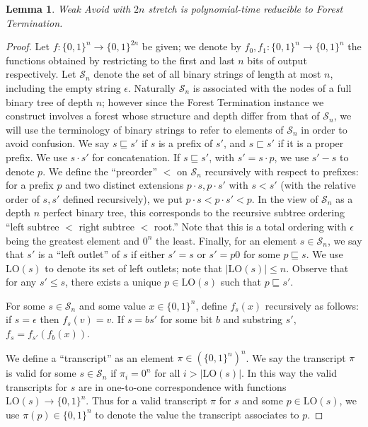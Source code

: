 \documentclass[11pt]{article}
\newtheorem{lemma}{Lemma}
\newcommand{\B}{\{0,1\}}
\begin{document}
\begin{lemma}\label{lem:avoid-forest}
Weak Avoid with $2n$ stretch is polynomial-time reducible to Forest Termination.
\end{lemma}
\begin{proof}
Let $f: \B^n \to \B^{2n}$ be given; we denote by $f_0,f_1: \B^n \to \B^n$ the functions obtained by restricting to the first and last $n$ bits of output respectively. Let $\mathcal{S}_n$ denote the set of all binary strings of length at most $n$, including the empty string $\epsilon$. Naturally $\mathcal{S}_n$ is associated with the nodes of a full binary tree of depth $n$; however since the Forest Termination instance we construct involves a forest whose structure and depth differ from that of $\mathcal{S}_n$, we will use the terminology of binary strings to refer to elements of $\mathcal{S}_n$ in order to avoid confusion. We say $s \sqsubseteq s'$ if $s$ is a prefix of $s'$, and $s\sqsubset s'$ if it is a proper prefix. We use $s \cdot s'$ for concatenation. If $s \sqsubseteq s'$, with $s' = s \cdot p$, we use $s' - s$ to denote $p$. We define the ``preorder'' $<$ on $\mathcal{S}_n$ recursively with respect to prefixes: for a prefix $p$ and two distinct extensions $p \cdot s, p \cdot s'$ with $s < s'$ (with the relative order of $s,s'$ defined recursively), we put $p \cdot s < p \cdot s' < p$. In the view of $\mathcal{S}_n$ as a depth $n$ perfect binary tree, this corresponds to the recursive subtree ordering ``left subtree $< $ right subtree $< $ root.'' Note that this is a total ordering with $\epsilon$ being the greatest element and $0^n$ the least. Finally, for an element $s \in \mathcal{S}_n$, we say that $s'$ is a ``left outlet'' of $s$ if either $s'=s$ or $s'=p0$ for some $p \sqsubseteq s$. We use $\mathrm{LO}(s)$ to denote its set of left outlets; note that $|\mathrm{LO}(s)| \leq n$. Observe that for any $s' \leq s$, there exists a unique $p \in \mathrm{LO}(s)$ such that $p \sqsubseteq s'$.

For some $s \in \mathcal{S}_n$ and some value $x \in \B^n$, define $f_s(x)$ recursively as follows: if $s = \epsilon$ then $f_s(v)=v$. If $s = bs'$ for some bit $b$ and substring $s'$, $f_{s} = f_{s'}(f_b(x))$.

We define a ``transcript'' as an element $\pi \in (\B^n)^n$. We say the transcript $\pi$ is valid for some $s \in \mathcal{S}_n$ if $\pi_i = 0^n$ for all $i > |\mathrm{LO}(s)|$. In this way the valid transcripts for $s$ are in one-to-one correspondence with functions $\mathrm{LO}(s) \to \B^n$. Thus for a valid transcript $\pi$ for $s$ and some $p \in \mathrm{LO}(s)$, we use $\pi(p) \in \B^n$ to denote the value the transcript associates to $p$. 


\end{proof}
\end{document}
